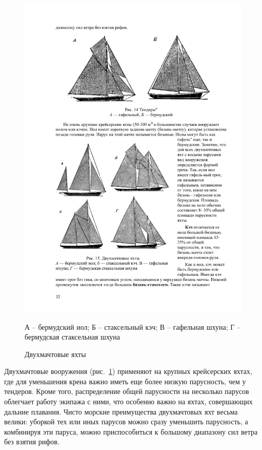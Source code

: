 \documentclass[a4paper, 12pt, twoside, final]{scrbook}
\begin{document}
\begin{figure}[htbp]
	\begin{centering}
		\includegraphics{pics/Dvukhmachtovye_yakhty}
		\par
	\end{centering}
	\protect\caption{\label{fig:15}Двухмачтовые яхты}
	\centering{}\small А \--- бермудский иол; Б \--- стаксельный кэч; В \--- гафельная шхуна; Г \--- бермудская стаксельная шхуна
\end{figure}


Двухмачтовые вооружения (рис.~\ref{fig:15})
применяют на крупных крейсерских яхтах, где для уменьшения крена важно
иметь еще более низкую парусность, чем у тендеров. Кроме того, распределение
общей парусности на несколько парусов облегчает работу экипажа с ними,
что особенно важно на яхтах, совершающих дальние плавания. Чисто морские
преимущества двухмачтовых яхт весьма велики: уборкой тех или иных
парусов можно сразу уменьшить парусность, а комбинируя эти паруса,
можно приспособиться к большому диапазону сил ветра без взятия рифов.
\end{document}
